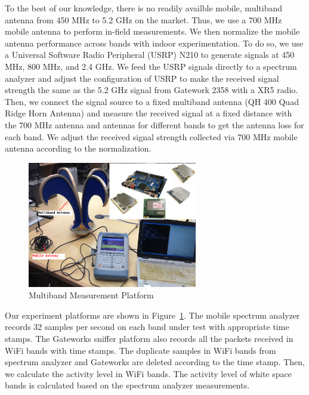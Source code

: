 To the best of our knowledge, there is no readily availble mobile, multiband antenna from
450 MHz to 5.2 GHz on the market. Thus, we use a 700 MHz mobile antenna to perform in-field
measurements. We then normalize the mobile antenna performance across bands with indoor 
experimentation. To do so, we use a Universal Software Radio Peripheral (USRP) N210 to 
generate signals at 450 MHz, 800 MHz, and 2.4 GHz. We feed the USRP signals directly
to a spectrum analyzer and adjust the configuration of USRP to make the received signal 
strength the same as the 5.2 GHz signal from Gatework 2358 with a XR5 radio. Then, we connect 
the signal source to a fixed multiband antenna (QH 400 Quad Ridge Horn Antenna) and measure the
received signal at a fixed distance with the 700 MHz antenna and antennas for different bands
to get the antenna loss for each band. We adjust the received signal strength
collected via 700 MHz mobile antenna according to the normalization.

  \begin{figure}
  \centering
  \includegraphics[width=74mm]{figures/equipment}
  \vspace{-0.1in}
  \caption{Multiband Measurement Platform}
  \label{fig:equipment}
  \vspace{-0.2in}
  \end{figure}
  
Our experiment platforms are shown in Figure~\ref{fig:equipment}.
The mobile spectrum analyzer records 32 samples per second on each band under test with 
appropriate time stamps.
The Gateworks sniffer platform also records all the packets received in WiFi bands with time stamps. 
The duplicate samples in WiFi bands from spectrum analyzer and Gateworks are deleted 
according to the time stamp. Then, we calculate the activity level in WiFi bands. 
The activity level of white space bands is calculated based on the spectrum analyzer measurements.  

